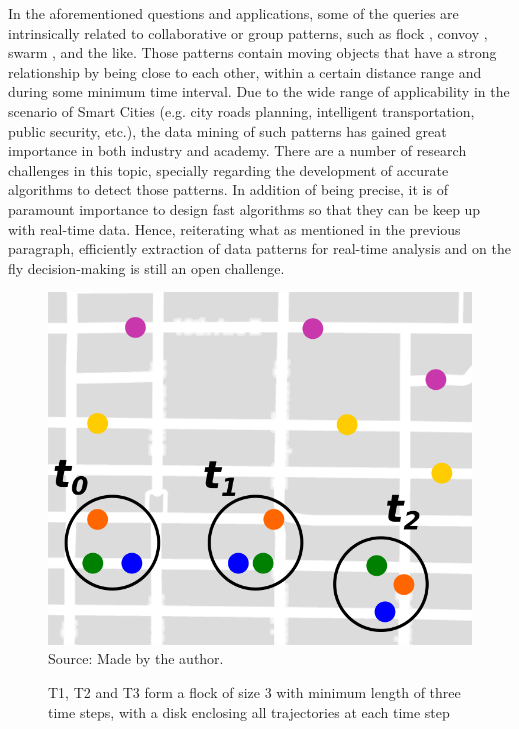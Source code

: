 In the aforementioned questions and applications, some of the queries are intrinsically related to collaborative or
group patterns, such as flock \citep{gudefficient}, convoy \citep{convoy}, swarm \citep{swarm}, and the like. Those
patterns contain moving objects that have a strong relationship by being close to each other, within a certain distance
range and during some minimum time interval. Due to the wide range of applicability in the scenario of Smart Cities
(e.g. city roads planning, intelligent transportation, public security, etc.), the data mining of such patterns has
gained great importance in both industry and academy. There are a number of research challenges in this topic, specially
regarding the development of accurate algorithms to detect those patterns. In addition of being precise, it is of
paramount importance to design fast algorithms so that they can be keep up with real-time data. Hence, reiterating what
as mentioned in the previous paragraph, efficiently extraction of data patterns for real-time analysis and on the fly
decision-making is still an open challenge.
%
%

\begin{figure}[h!]
    \centering
    \caption{T1, T2 and T3 form a flock of size 3 with minimum length of three time steps, with a disk enclosing all
        trajectories at each time step}
    \includegraphics[width=0.7\linewidth]{images/flock_pattern.png}
    \footnotesize{Source: Made by the author.}
    \label{fig:flocks}
\end{figure}

